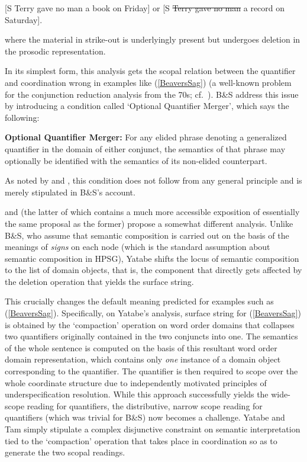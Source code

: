 \documentclass[output=paper]{langsci/langscibook}
\begin{document}
\begin{exe}
 \ex\label{BeaversSag}
  [S Terry gave no man a book on Friday] or
  [S \sout{Terry gave no man} a record on Saturday]. 
\end{exe}
where the material in strike-out is underlyingly present but undergoes
deletion in the prosodic representation.

In its simplest form, this analysis gets the scopal relation between
the quantifier and coordination wrong in examples like (\ref{BeaversSag}) (a
well-known problem for the conjunction reduction analysis from the 70s; cf.\ \citet{partee70}).
B\&S address this issue by introducing a condition called `Optional
Quantifier Merger', which says the following:

\begin{exe}
 \ex\label{OQM}
  \textbf{Optional Quantifier Merger:} For any elided phrase 
  denoting a generalized quantifier in the 
  domain of either conjunct, the semantics of that phrase may
  optionally be identified with the semantics of its non-elided
  counterpart.
\end{exe}
As noted by \citet{levine11} and \citet{kubota-levine-coord}, this condition
does not follow from any general principle and is merely stipulated in
B\&S's account.

\citet{Yatabe2001a} and \citet{yatabe-tam2017} (the latter of which contains a
much more accessible exposition of essentially the same proposal as
the former) propose a somewhat different analysis. Unlike B\&S, who
assume that semantic composition is carried out on the basis of the
meanings of \emph{signs} on each node (which is the standard assumption
about semantic composition in HPSG), Yatabe shifts the locus of
semantic composition to the list of domain objects, that is, the
component that directly gets affected by the deletion operation that
yields the surface string.

This crucially changes the default meaning
predicted for examples such as (\ref{BeaversSag}). 
Specifically, on Yatabe's
analysis, surface string for (\ref{BeaversSag}) is obtained by the
`compaction' operation on word order domains that collapses two
quantifiers originally contained in the two conjuncts into one. The
semantics of the whole sentence is computed on the basis of this
resultant word order domain representation, which contains only \emph{one}
instance of a domain object corresponding to the quantifier. The
quantifier is then required to scope over the whole coordinate
structure due to independently motivated principles of
underspecification resolution. While this approach successfully yields
the wide-scope reading for quantifiers, the distributive, narrow scope
reading for quantifiers (which was trivial for B\&S) now becomes a
challenge. Yatabe and Tam simply stipulate a complex disjunctive
constraint on semantic interpretation tied to the `compaction'
operation that takes place in coordination so as to generate the two
scopal readings.
\end{document}
